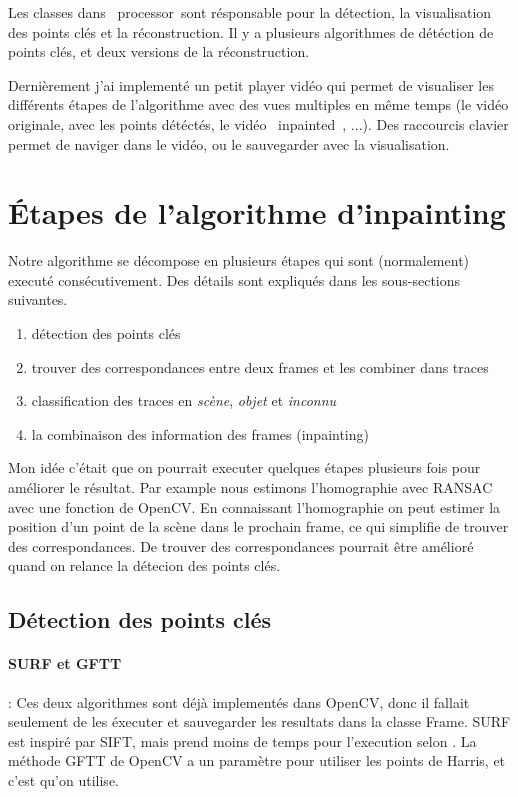 \documentclass[8pt,twoside=off,titlepage=false, twocolumn]{scrartcl}
\begin{document}
Les classes dans \flqq\ processor\frqq\ sont résponsable pour la détection, la visualisation des points clés et la réconstruction. Il y a plusieurs algorithmes de détéction de points clés, et deux versions de la réconstruction.

Dernièrement j'ai implementé un petit player vidéo qui permet de visualiser les différents étapes de l'algorithme avec des vues multiples en même temps (le vidéo originale, avec les points détéctés, le vidéo \mbox{\flqq\ inpainted \frqq}, ...). Des raccourcis clavier permet de naviger dans le vidéo, ou le sauvegarder avec la visualisation.

\section{Étapes de l'algorithme d'inpainting}

Notre algorithme se décompose en plusieurs étapes qui sont (normalement) executé consécutivement. Des détails sont expliqués dans les sous-sections suivantes.

\begin{enumerate}
\item détection des points clés
\item trouver des correspondances entre deux frames et les combiner dans traces
\item classification des traces en \emph{scène}, \emph{objet} et \emph{inconnu}
\item la combinaison des information des frames (inpainting)
\end{enumerate}

Mon idée c'était que on pourrait executer quelques étapes plusieurs fois pour améliorer le résultat. Par example nous estimons l'homographie avec RANSAC avec une fonction de OpenCV. En connaissant l'homographie on peut estimer la position d'un point de la scène dans le prochain frame, ce qui simplifie de trouver des correspondances. De trouver des correspondances pourrait être amélioré quand on relance la détecion des points clés.

\subsection{Détection des points clés}

\paragraph{SURF et GFTT} : Ces deux algorithmes sont déjà implementés dans OpenCV, donc il fallait seulement de les éxecuter et sauvegarder les resultats dans la classe Frame. SURF est inspiré par SIFT, mais prend moins de temps pour l'execution selon \cite{surf}. La méthode GFTT de OpenCV a un paramètre pour utiliser les points de Harris, et c'est qu'on utilise.
\end{document}
